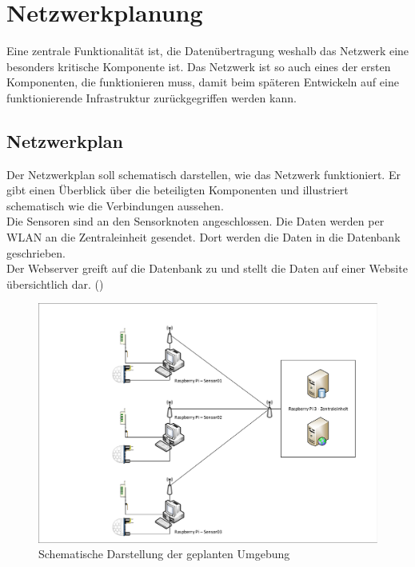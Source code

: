 \section{Netzwerkplanung}
Eine zentrale Funktionalität ist, die Datenübertragung weshalb das Netzwerk eine besonders kritische Komponente ist. Das Netzwerk ist so auch eines der ersten Komponenten, die funktionieren muss, damit beim späteren Entwickeln auf eine funktionierende Infrastruktur zurückgegriffen werden kann.

\subsection{Netzwerkplan}
Der Netzwerkplan soll schematisch darstellen, wie das Netzwerk funktioniert. Er gibt einen Überblick über die beteiligten Komponenten und illustriert schematisch wie die Verbindungen aussehen.\\
Die Sensoren sind an den Sensorknoten angeschlossen. Die Daten werden per WLAN
an die Zentraleinheit gesendet. Dort werden die Daten in die Datenbank
geschrieben.\\
Der Webserver greift auf die Datenbank zu und stellt die Daten auf einer Website
übersichtlich dar. ()
\begin{figure} [htb]
\begin{centering}
\includegraphics[scale=0.4]{Bilder/Netzplan.pdf}
\caption[Schematische Darstellung der geplanten Umgebung]{Schematische
Darstellung der geplanten Umgebung}
\label{Darstellung_Umgebung}
\end{centering}
\end{figure} 


